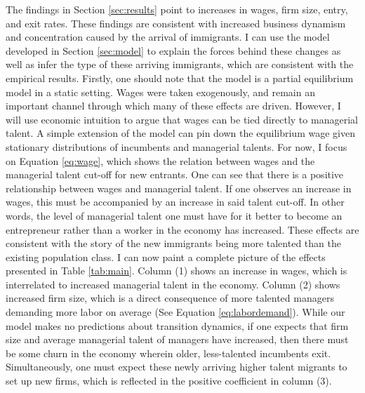 
The findings in Section \ref{sec:results} point to increases in wages, firm size, entry, and exit rates. These findings are consistent with increased business dynamism and concentration caused by the arrival of immigrants. I can use the model developed in Section \ref{sec:model} to explain the forces behind these changes as well as infer the type of these arriving immigrants, which are consistent with the empirical results. Firstly, one should note that the model is a partial equilibrium model in a static setting. Wages were taken exogenously, and remain an important channel through which many of these effects are driven. However, I will use economic intuition to argue that wages can be tied directly to managerial talent. A simple extension of the model can pin down the equilibrium wage given stationary distributions of incumbents and managerial talents. For now, I focus on Equation \eqref{eq:wage}, which shows the relation between wages and the managerial talent cut-off for new entrants. One can see that there is a positive relationship between wages and managerial talent. If one observes an increase in wages, this must be accompanied by an increase in said talent cut-off. In other words, the level of managerial talent one must have for it better to become an entrepreneur rather than a worker in the economy has increased. These effects are consistent with the story of the new immigrants being more talented than the existing population class. I can now paint a complete picture of the effects presented in Table \ref{tab:main}. Column (1) shows an increase in wages, which is interrelated to increased managerial talent in the economy. Column (2) shows increased firm size, which is a direct consequence of more talented managers demanding more labor on average (See Equation \eqref{eq:labordemand}). While our model makes no predictions about transition dynamics, if one expects that firm size and average managerial talent of managers have increased, then there must be some churn in the economy wherein older, less-talented incumbents exit. Simultaneously, one must expect these newly arriving higher talent migrants to set up new firms, which is reflected in the positive coefficient in column (3).

